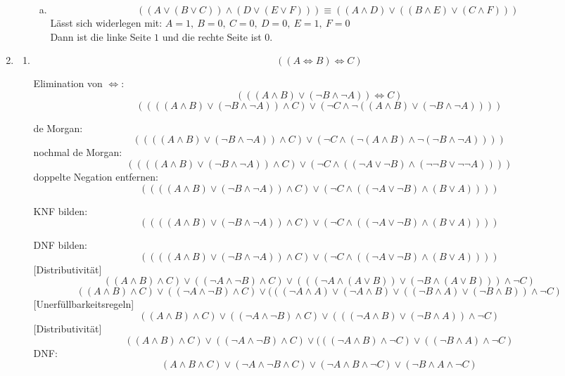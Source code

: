 \documentclass[a4paper,10pt]{scrartcl}
\newcommand{\aufgabe}[1]{\item[\textbf{#1}]}
\begin{document}
\begin{enumerate}
\begin{enumerate}[1.]
\begin{enumerate}[a)]
   \item
   $$((A\vee(B\vee C))\wedge(D\vee(E\vee F))) \equiv ((A\wedge D)\vee ((B\wedge E)\vee(C\wedge F)))$$
   Lässt sich widerlegen mit: $A=1,\ B=0,\ C=0,\ D=0,\ E=1,\ F=0$\\
   Dann ist die linke Seite $1$ und die rechte Seite ist $0$.

  \end{enumerate}

\end{enumerate}

\aufgabe{6.4}

\begin{enumerate}[1.]
 \item
  $$((A\Leftrightarrow B)\Leftrightarrow C)$$

  Elimination von $\Leftrightarrow$:
  $$(((A\wedge B)\vee(\neg B\wedge\neg A))\Leftrightarrow C)$$
  $$((((A\wedge B)\vee(\neg B\wedge\neg A))\wedge C)\vee(\neg C\wedge\neg((A\wedge B)\vee(\neg B\wedge\neg A))) )$$

  de Morgan:
  $$((((A\wedge B)\vee(\neg B\wedge\neg A))\wedge C) \vee(\neg C\wedge(\neg(A\wedge B)\wedge\neg(\neg B\wedge\neg A))))$$
  nochmal de Morgan:
  $$((((A\wedge B)\vee(\neg B\wedge\neg A))\wedge C) \vee(\neg C\wedge((\neg A\vee \neg B)\wedge(\neg\neg B\vee\neg\neg A))))$$
  doppelte Negation entfernen:
  $$((((A\wedge B)\vee(\neg B\wedge\neg A))\wedge C) \vee(\neg C\wedge((\neg A\vee \neg B)\wedge(B\vee A))))$$

  KNF bilden: %
  $$((((A\wedge B)\vee(\neg B\wedge\neg A))\wedge C) \vee(\neg C\wedge((\neg A\vee \neg B)\wedge(B\vee A))))$$

  DNF bilden: %
  $$((((A\wedge B)\vee(\neg B\wedge\neg A))\wedge C) \vee(\neg C\wedge((\neg A\vee \neg B)\wedge(B\vee A))))$$
  [Distributivität]
  $$ ((A \wedge B) \wedge C) \vee ((\neg A \wedge \neg B) \wedge C) \vee (((\neg A \wedge (A \vee B)) \vee (\neg B \wedge ( A \vee B))) \wedge \neg C) $$
  $$ ((A \wedge B) \wedge C) \vee ((\neg A \wedge \neg B) \wedge C) \vee (((\neg A \wedge A) \vee (\neg A \wedge B) \vee ((\neg B \wedge A) \vee (\neg B \wedge B)) \wedge \neg C) $$
  [Unerfüllbarkeitsregeln]
  $$ ((A \wedge B) \wedge C) \vee ((\neg A \wedge \neg B) \wedge C) \vee ((( \neg A \wedge B) \vee (\neg B \wedge A)) \wedge \neg C) $$
  [Distributivität]
  $$ ((A \wedge B) \wedge C) \vee ((\neg A \wedge \neg B) \wedge C) \vee ((( \neg A \wedge B) \wedge \neg C) \vee (( \neg B \wedge A) \wedge \neg C) $$
  DNF:
  $$ (A \wedge B \wedge C) \vee (\neg A \wedge \neg B \wedge C) \vee (\neg A \wedge B \wedge \neg C) \vee (\neg B \wedge A \wedge \neg C) $$


\end{enumerate}
\end{enumerate}
\end{document}
